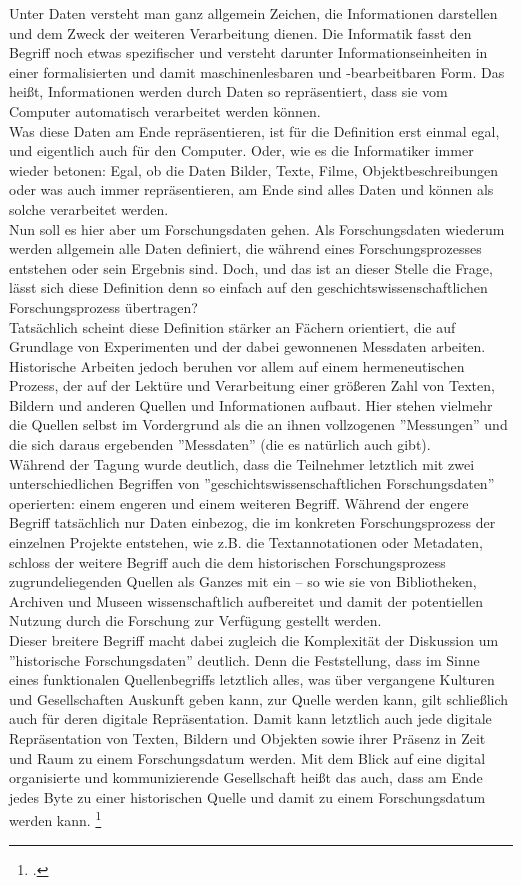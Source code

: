 \documentclass[12pt,a4paper]{article}
\begin{document}
Unter Daten versteht man ganz allgemein Zeichen, die Informationen darstellen und dem Zweck der weiteren Verarbeitung dienen. Die Informatik fasst den Begriff noch etwas spezifischer und versteht darunter Informationseinheiten in einer formalisierten und damit maschinenlesbaren und -bearbeitbaren Form. Das heißt, Informationen werden durch Daten so repräsentiert, dass sie vom Computer automatisch verarbeitet werden können.
\\
Was diese Daten am Ende repräsentieren, ist für die Definition erst einmal egal, und eigentlich auch für den Computer. Oder, wie es die Informatiker immer wieder betonen: Egal, ob die Daten Bilder, Texte, Filme, Objektbeschreibungen oder was auch immer repräsentieren, am Ende sind alles Daten und können als solche verarbeitet werden.
\\
Nun soll es hier aber um Forschungsdaten gehen. Als Forschungsdaten wiederum werden allgemein alle Daten definiert, die während eines Forschungsprozesses entstehen oder sein Ergebnis sind. Doch, und das ist an dieser Stelle die Frage, lässt sich diese Definition denn so einfach auf den geschichtswissenschaftlichen Forschungsprozess übertragen?
\\
Tatsächlich scheint diese Definition stärker an Fächern orientiert, die auf Grundlage von Experimenten und der dabei gewonnenen Messdaten arbeiten. Historische Arbeiten jedoch beruhen vor allem auf einem hermeneutischen Prozess, der auf der Lektüre und Verarbeitung einer größeren Zahl von Texten, Bildern und anderen Quellen und Informationen aufbaut. Hier stehen vielmehr die Quellen selbst im Vordergrund als die an ihnen vollzogenen ''Messungen'' und die sich daraus ergebenden ''Messdaten'' (die es natürlich auch gibt).
\\
Während der Tagung wurde deutlich, dass die Teilnehmer letztlich mit zwei unterschiedlichen Begriffen von ''geschichtswissenschaftlichen Forschungsdaten'' operierten: einem engeren und einem weiteren Begriff. Während der engere Begriff tatsächlich nur Daten einbezog, die im konkreten Forschungsprozess der einzelnen Projekte entstehen, wie z.B. die Textannotationen oder Metadaten, schloss der weitere Begriff auch die dem historischen Forschungsprozess zugrundeliegenden Quellen als Ganzes mit ein – so wie sie von Bibliotheken, Archiven und Museen wissenschaftlich aufbereitet und damit der potentiellen Nutzung durch die Forschung zur Verfügung gestellt werden.
\\
Dieser breitere Begriff macht dabei zugleich die Komplexität der Diskussion um ''historische Forschungsdaten'' deutlich. Denn die Feststellung, dass im Sinne eines funktionalen Quellenbegriffs letztlich alles, was über vergangene Kulturen und Gesellschaften Auskunft geben kann, zur Quelle werden kann, gilt schließlich auch für deren digitale Repräsentation. Damit kann letztlich auch jede digitale Repräsentation von Texten, Bildern und Objekten sowie ihrer Präsenz in Zeit und Raum zu einem Forschungsdatum werden. Mit dem Blick auf eine digital organisierte und kommunizierende Gesellschaft heißt das auch, dass am Ende jedes Byte zu einer historischen Quelle und damit zu einem Forschungsdatum werden kann. \footcite[Vgl.][]{hiltman2018forschungsdaten}
\end{document}

